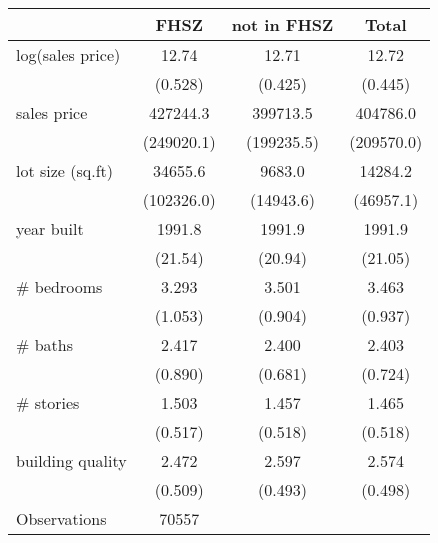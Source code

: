 \begin{tabular}{l*{3}{c}}
\hline\hline
                    &        FHSZ& not in FHSZ&       Total\\
\hline
log(sales price)    &       12.74&       12.71&       12.72\\
                    &     (0.528)&     (0.425)&     (0.445)\\
[1em]
sales price         &    427244.3&    399713.5&    404786.0\\
                    &  (249020.1)&  (199235.5)&  (209570.0)\\
[1em]
lot size (sq.ft)    &     34655.6&      9683.0&     14284.2\\
                    &  (102326.0)&   (14943.6)&   (46957.1)\\
[1em]
year built          &      1991.8&      1991.9&      1991.9\\
                    &     (21.54)&     (20.94)&     (21.05)\\
[1em]
\# bedrooms         &       3.293&       3.501&       3.463\\
                    &     (1.053)&     (0.904)&     (0.937)\\
[1em]
\# baths            &       2.417&       2.400&       2.403\\
                    &     (0.890)&     (0.681)&     (0.724)\\
[1em]
\# stories          &       1.503&       1.457&       1.465\\
                    &     (0.517)&     (0.518)&     (0.518)\\
[1em]
building quality    &       2.472&       2.597&       2.574\\
                    &     (0.509)&     (0.493)&     (0.498)\\
\hline
Observations        &       70557&            &            \\
\hline\hline
\end{tabular}
